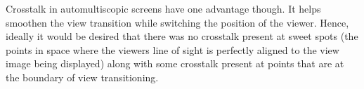 Crosstalk in automultiscopic screens have one advantage though. It helps smoothen the view transition while switching the position of the viewer. Hence, ideally it would be desired that there was no crosstalk present at sweet spots (the points in space where the viewers line of sight is perfectly aligned to the view image being displayed) along with some crosstalk present at points that are at the boundary of view transitioning.











